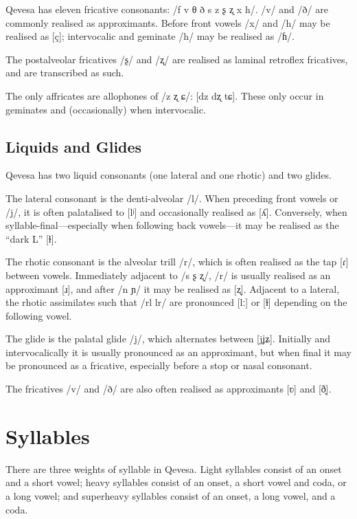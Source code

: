 \documentclass[grammar]{subfiles}
\begin{document}
Qevesa has eleven fricative consonants: /f v θ ð s z ʂ ʐ x h/.  /v/ and /ð/ are
commonly realised as approximants.  Before front vowels /x/ and /h/ may be realised
as [ç]; intervocalic and geminate /h/ may be realised as /ɦ/. 

The postalveolar fricatives /ʂ/ and /ʐ/ are realised as laminal retroflex
fricatives, and are transcribed as such.

The only affricates are allophones of /z ʐ ɕ/: [dz dʐ tɕ]. These only occur in
geminates and (occasionally) when intervocalic. 


\subsection{Liquids and Glides}
\label{ssec:liquids}

Qevesa has two liquid consonants (one lateral and one rhotic) and two glides.

The lateral consonant is the denti-alveolar /l/.  When preceding front vowels
or /j/, it is often palatalised to [lʲ] and occasionally realised as [ʎ].
Conversely, when syllable-final—especially when following back vowels—it may be
realised as the “dark L” [ɫ].

The rhotic consonant is the alveolar trill /r/, which is often realised as the
tap [ɾ] between vowels.  Immediately adjacent to /s ʂ ʐ/, /r/ is usually
realised as an approximant [ɹ], and after /n ɲ/ it may be realised as [ʐ].
Adjacent to a lateral, the rhotic assimilates such that /rl lr/ are pronounced
[lː] or [ɫ] depending on the following vowel.

The glide is the palatal glide /j/, which alternates between [j\tlde ʝ\tlde ʑ].
Initially and intervocalically it is usually pronounced as an approximant, but
when final it may be pronounced as a fricative, especially before a stop or
nasal consonant.  

The fricatives /v/ and /ð/ are also often realised as approximants [ʋ] and [ð̞].  


\section{Syllables}
\label{sec:syllables}

There are three weights of syllable in Qevesa. Light syllables consist of an
onset and a short vowel; heavy syllables consist of an onset, a short vowel and
coda, or a long vowel; and superheavy syllables consist of an onset, a long
vowel, and a coda. 
\end{document}
